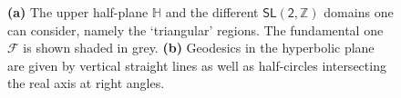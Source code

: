 \begin{figure}[htb]
		\begin{center}
            \quad
			\caption{\small \textbf{(a)} The upper half-plane $\mathbb{H}$ and the different $\mathsf{SL(2,\mathbb{Z})}$ domains one can consider, namely the `triangular' regions. The fundamental one $\mathscr{F}$ is shown shaded in grey. \textbf{(b)} Geodesics in the hyperbolic plane are given by vertical straight lines as well as half-circles intersecting the real axis at right angles.}
			
		\end{center}
\end{figure} 

